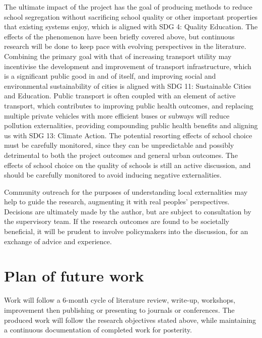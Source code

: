 \documentclass{article}
\begin{document}
\begin{multicols}{2}
The ultimate impact of the project has the goal of producing methods to reduce school segregation without sacrificing school quality or other important properties that existing systems enjoy, which is aligned with SDG 4: Quality Education. The effects of the phenomenon have been briefly covered above, but continuous research will be done to keep pace with evolving perspectives in the literature. Combining the primary goal with that of increasing transport utility may incentivise the development and improvement of transport infrastructure, which is a significant public good in and of itself, and improving social and environmental sustainability of cities is aligned with SDG 11: Sustainable Cities and Education. Public transport is often coupled with an element of active transport, which contributes to improving public health outcomes, and replacing multiple private vehicles with more efficient buses or subways will reduce pollution externalities, providing compounding public health benefits and aligning us with SDG 13: Climate Action. The potential resorting effects of school choice must be carefully monitored, since they can be unpredictable and possibly detrimental to both the project outcomes and general urban outcomes. The effects of school choice on the quality of schools is still an active discussion, and should be carefully monitored to avoid inducing negative externalities.

Community outreach for the purposes of understanding local externalities may help to guide the research, augmenting it with real peoples' perspectives. Decisions are ultimately made by the author, but are subject to consultation by the supervisory team. If the research outcomes are found to be societally beneficial, it will be prudent to involve policymakers into the discussion, for an exchange of advice and experience.


\section{Plan of future work}
Work will follow a 6-month cycle of literature review, write-up, workshops, improvement then publishing or presenting to journals or conferences. The produced work will follow the research objectives stated above, while maintaining a continuous documentation of completed work for posterity.

\end{multicols}

\break
\printbibliography
\end{document}
